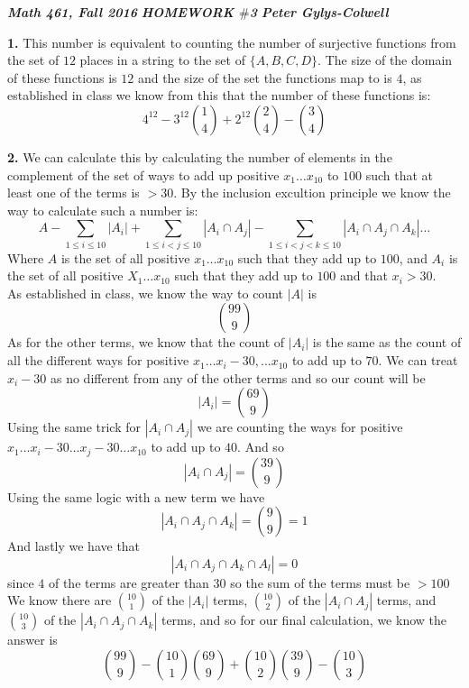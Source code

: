 \documentclass[12pt]{article}
\newenvironment{ques}{\vspace{2 ex}}{\vspace{2 ex}}
\theoremstyle{definition}
\begin{document}
\noindent \textit{\textbf{Math 461, Fall 2016}} \hspace{1.3cm} \textit{\textbf{HOMEWORK $\#$3}} \hspace{1.3cm} \textit{\textbf{Peter Gylys-Colwell}} 

\vspace{1cm}

\begin{ques}
	\textbf{1.} This number is equivalent to counting the number of
	surjective functions from the set of $12$ places in a string to the set
	of $\{A,B,C,D\}$. The size of the domain of these functions is $12$ and
	the size of the set the functions map to is $4$, as established in
	class we know from this that the number of these functions is:
	$$4^{12} - 3^{12}\binom{1}{4} + 2^{12}\binom{2}{4} - \binom{3}{4}$$
\end{ques}

\begin{ques}
	\textbf{2.} We can calculate this by calculating the number of elements
		in the  complement of the set of ways to add up positive $x_1 \dots
		x_{10}$ to $100$ such that at least one of the terms is $> 30$. By the
		inclusion excultion principle we know the way to calculate such a
		number is:
		$$A - \sum_{1 \leq i \leq 10}|A_i| + \sum_{1 \leq i < j \leq
		10} |A_i \cap A_j| - \sum_{1 \leq i < j < k \leq 10} |A_i \cap
		A_j \cap A_k|\dots$$
		Where $A$ is the set of all positive $x_1 \dots x_{10}$ such
		that they add up to $100$, and $A_i$ is the set of all positive
		$X_1 \dots x_{10}$ such that they add up to $100$ and that $x_i
		> 30$.\\
		As established in class, we know the way to count $|A|$ is 
		$$\binom{99}{9}$$
		As for the other terms, we know that the count of $|A_i|$ is
		the same as the count of all the different ways for positive
		$x_1 \dots x_i - 30, \dots x_{10}$ to add up to $70$. We can
		treat $x_i - 30$ as no different from any of the other terms
		and so our count will be 
		$$|A_i| = \binom{69}{9}$$
		Using the same trick for $|A_i \cap A_j|$ we are counting the
		ways for positive $x_1 \dots x_i - 30 \dots x_j -30 \dots
		x_{10}$ to add up to $40$. And so 
		$$|A_i \cap A_j| = \binom{39}{9}$$
		Using the same logic with a new term we have
		$$|A_i \cap A_j \cap A_k| = \binom{9}{9} = 1$$
		And lastly we have that
		$$|A_i \cap A_j \cap A_k \cap A_l| = 0$$
		since $4$ of the terms are greater than $30$ so the sum of the
		terms must be $>100$\\
		We know there are $\binom{10}{1}$ of the $|A_i|$ terms,
		$\binom{10}{2}$ of the $|A_i \cap A_j|$ terms, and
		$\binom{10}{3}$ of the $|A_i \cap A_j \cap A_k|$ terms, and so
		for our final calculation, we know the answer is 
		$$\binom{99}{9} - \binom{10}{1}\binom{69}{9} +
		\binom{10}{2}\binom{39}{9} - \binom{10}{3}$$
\end{ques}
\end{document}
